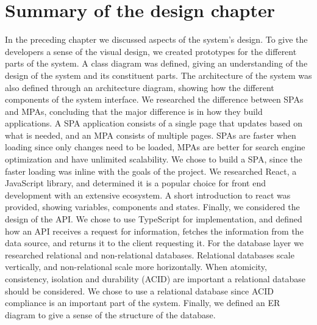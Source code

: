 \section{Summary of the design chapter}
In the preceding chapter we discussed aspects of the system's design.
To give the developers a sense of the visual design, we created prototypes for the different parts of the system.
A class diagram was defined, giving an understanding of the design of the system and its constituent parts.
The architecture of the system was also defined through an architecture diagram, showing how the different components of the system interface.
We researched the difference between SPAs and MPAs, concluding that the major difference is in how they build applications.
A SPA application consists of a single page that updates based on what is needed, and an MPA consists of multiple pages.
SPAs are faster when loading since only changes need to be loaded, MPAs are better for search engine optimization and have unlimited scalability.
We chose to build a SPA, since the faster loading was inline with the goals of the project. 
We researched React, a JavaScript library, and determined it is a popular choice for front end development with an extensive ecosystem.
A short introduction to react was provided, showing variables, components and states.
Finally, we considered the design of the API.
We chose to use TypeScript for implementation, and defined how an API receives a request for information, fetches the information from the data source, and returns it to the client requesting it.
For the database layer we researched relational and non-relational databases.
Relational databases scale vertically, and non-relational scale more horizontally.
When atomicity, consistency, isolation and durability (ACID) are important a relational database should be considered.
We chose to use a relational database since ACID compliance is an important part of the system.
Finally, we defined an ER diagram to give a sense of the structure of the database.
